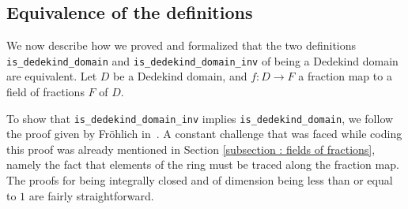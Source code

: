 \documentclass[a4paper,USenglish,cleveref, autoref, thm-restate]{lipics-v2021}
\newcommand{\lean}[1]{\texttt{#1}\xspace} %
\newcommand{\mathlib}{\textsf{mathlib}\xspace}
\begin{document}
%
%

\subsection{Equivalence of the definitions} \label{sec:equivalence}
We now describe how we proved and formalized that the two definitions \lean{is\_dedekind\_domain} and \lean{is\_dedekind\_domain\_inv} of being a Dedekind domain are equivalent. Let $D$ be a Dedekind domain, and $f\colon D\to F$ a fraction map to a field of fractions $F$ of $D$.

To show that \lean{is\_dedekind\_domain\_inv} implies \lean{is\_dedekind\_domain}, we follow the proof given by Fr\"ohlich in~\cite[Chapter 1, \S~2, ~Proposition 1.2.1]{frohlich}. A constant challenge that was faced while coding this proof was already mentioned in Section \ref{subsection : fields of fractions}, namely the fact that elements of the ring must be traced along the fraction map. %
The proofs for being integrally closed and of dimension being less than or equal to $1$ are fairly straightforward.
\end{document}
